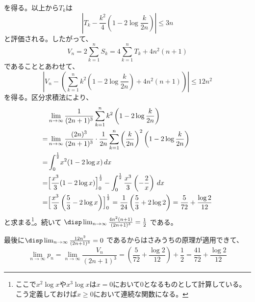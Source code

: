 を得る。以上から$T_k$は
\[ \left|T_k-\frac{k^2}{4}\left(1-2\log\frac{k}{2n}\right)\right| \le 3n \]
と評価される。したがって、
\[ V_n=2\sum_{k=1}^nS_k=4\sum_{k=1}^nT_k+4n^2(n+1) \]
であることとあわせて、
\[ \left|V_n-\left(\sum_{k=1}^nk^2\left(1-2\log\frac{k}{2n}\right)+4n^2(n+1)\right)\right| \le 12n^2 \]
を得る。区分求積法により、
\begin{align*}
 &\lim_{n\to\infty}\frac{1}{(2n+1)^3}\sum_{k=1}^nk^2\left(1-2\log\frac{k}{2n}\right) \\
 =& \lim_{n\to\infty}\frac{(2n)^3}{(2n+1)^3}\cdot\frac{1}{2n}\sum_{k=1}^n\left(\frac{k}{2n}\right)^2\left(1-2\log\frac{k}{2n}\right) \\
 =& \int_0^{\frac{1}{2}}\! x^2(1-2\log x) \,dx \\
 =& \Bigl[\frac{x^3}{3}(1-2\log x)\Bigr]^{\frac{1}{2}}_0-\int_0^{\frac{1}{2}}\frac{x^3}{3}\left(-\frac{2}{x}\right) \,dx \\
 =& \Bigl[\frac{x^3}{3}\left(\frac{5}{3}-2\log x\right)\Bigr]^{\frac{1}{2}}_0 = \frac{1}{24}\left(\frac{5}{3}+2\log 2\right)=\frac{5}{72}+\frac{\log 2}{12}
\end{align*}
と求まる\footnote{ここで$x^2\log x$や$x^3\log x$は$x=0$において0となるものとして計算している。こう定義しておけば$x\ge 0$において連続な関数になる。}。続いて $\disp \lim_{n\to\infty}\frac{4n^2(n+1)}{(2n+1)^3}=\frac{1}{2}$ である。

最後に$\disp \lim_{n\to\infty}\frac{12n^2}{(2n+1)^3}=0$ であるからはさみうちの原理が適用できて、
\[ \lim_{n\to\infty}p_n=\lim_{n\to\infty}\frac{V_n}{(2n+1)^3}=\left(\frac{5}{72}+\frac{\log 2}{12}\right)+\frac{1}{2}=\frac{41}{72}+\frac{\log 2}{12} \]
